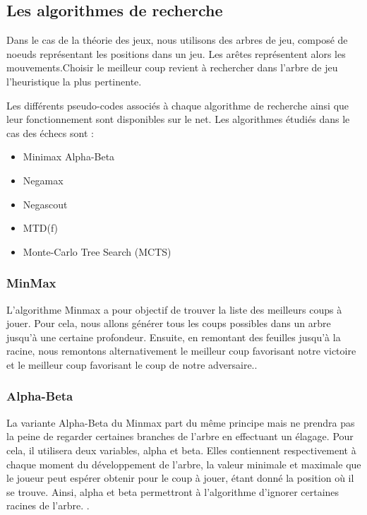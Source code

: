 \huge\documentclass{article}
\begin{document}
\subsection{Les algorithmes de recherche}
Dans le cas de la théorie des jeux, nous utilisons des arbres de jeu, composé de noeuds représentant les positions dans un jeu. Les arêtes représentent alors les mouvements.\newline Choisir le meilleur coup revient à rechercher dans l'arbre de jeu l'heuristique la plus pertinente.

Les différents pseudo-codes associés à chaque algorithme de recherche ainsi que leur fonctionnement sont disponibles sur le net. Les algorithmes étudiés dans le cas des échecs sont :

\begin{itemize}
    \item Minimax Alpha-Beta\cite{Minmax-ab}
    \item Negamax \cite{Negamax}
    \item Negascout \cite{Negascout}
    \item MTD(f) \cite{MTD(f)}
    \item Monte-Carlo Tree Search (MCTS) \cite{MCTS}
\end{itemize}

\subsubsection{MinMax}
L'algorithme Minmax a pour objectif de trouver la liste des meilleurs coups à jouer. Pour cela, nous allons générer tous les coups possibles dans un arbre jusqu'à une certaine profondeur. Ensuite, en remontant des feuilles jusqu'à la racine, nous remontons alternativement le meilleur coup favorisant notre victoire et le meilleur coup favorisant le coup de notre adversaire.\cite{Heuristiques}.

\subsubsection{Alpha-Beta}
La variante Alpha-Beta du Minmax part du même principe mais ne prendra pas la peine de regarder certaines branches de l'arbre en effectuant un élagage. Pour cela, il utilisera deux variables, alpha et beta. Elles contiennent respectivement à chaque moment du développement de l'arbre, la valeur minimale et maximale que le joueur peut espérer obtenir pour le coup à jouer, étant donné la position où il se trouve. Ainsi, alpha et beta permettront à l'algorithme d'ignorer certaines racines de l'arbre. \cite{Heuristiques}.
\end{document}
